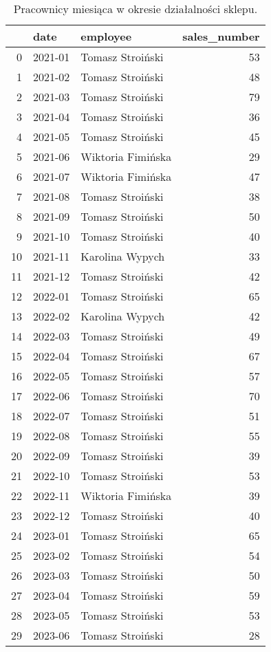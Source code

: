 \begin{table}[h]
\centering
\caption{Pracownicy miesiąca w okresie działalności sklepu.}\label{tab:tab1}
\begin{tabular}{rllr}
\hline
    & date    & employee          &   sales\_number \\
\hline
  0 & 2021-01 & Tomasz Stroiński  &             53 \\
  1 & 2021-02 & Tomasz Stroiński  &             48 \\
  2 & 2021-03 & Tomasz Stroiński  &             79 \\
  3 & 2021-04 & Tomasz Stroiński  &             36 \\
  4 & 2021-05 & Tomasz Stroiński  &             45 \\
  5 & 2021-06 & Wiktoria Fimińska &             29 \\
  6 & 2021-07 & Wiktoria Fimińska &             47 \\
  7 & 2021-08 & Tomasz Stroiński  &             38 \\
  8 & 2021-09 & Tomasz Stroiński  &             50 \\
  9 & 2021-10 & Tomasz Stroiński  &             40 \\
 10 & 2021-11 & Karolina Wypych   &             33 \\
 11 & 2021-12 & Tomasz Stroiński  &             42 \\
 12 & 2022-01 & Tomasz Stroiński  &             65 \\
 13 & 2022-02 & Karolina Wypych   &             42 \\
 14 & 2022-03 & Tomasz Stroiński  &             49 \\
 15 & 2022-04 & Tomasz Stroiński  &             67 \\
 16 & 2022-05 & Tomasz Stroiński  &             57 \\
 17 & 2022-06 & Tomasz Stroiński  &             70 \\
 18 & 2022-07 & Tomasz Stroiński  &             51 \\
 19 & 2022-08 & Tomasz Stroiński  &             55 \\
 20 & 2022-09 & Tomasz Stroiński  &             39 \\
 21 & 2022-10 & Tomasz Stroiński  &             53 \\
 22 & 2022-11 & Wiktoria Fimińska &             39 \\
 23 & 2022-12 & Tomasz Stroiński  &             40 \\
 24 & 2023-01 & Tomasz Stroiński  &             65 \\
 25 & 2023-02 & Tomasz Stroiński  &             54 \\
 26 & 2023-03 & Tomasz Stroiński  &             50 \\
 27 & 2023-04 & Tomasz Stroiński  &             59 \\
 28 & 2023-05 & Tomasz Stroiński  &             53 \\
 29 & 2023-06 & Tomasz Stroiński  &             28 \\
\hline
\end{tabular}\end{table}